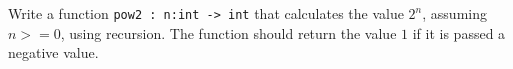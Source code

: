 Write a function \lstinline{pow2 : n:int -> int} that calculates the
value $2^n$, assuming $n >= 0$, using recursion. The function should
return the value $1$ if it is passed a negative value.
